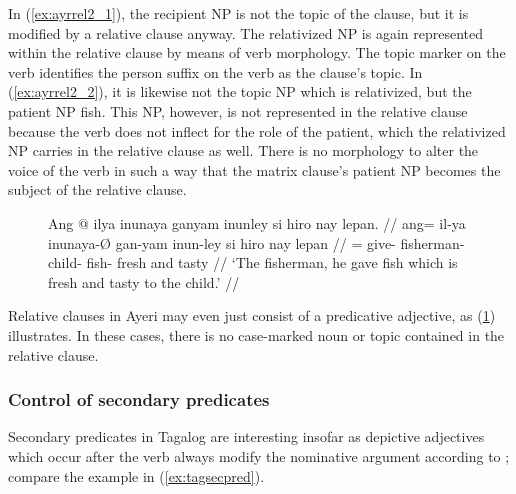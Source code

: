 In (\ref{ex:ayrrel2_1}), the recipient NP 
is not the topic of the clause, but it is modified by a relative clause anyway.
The relativized NP is again represented within the relative clause by means of
verb morphology. The topic marker on the verb identifies the person suffix on
the verb as the clause's topic. In (\ref{ex:ayrrel2_2}), it is likewise not the
topic NP which is relativized, but the patient NP 
{fish}. This NP, however, is not represented in the relative clause because the
verb does not inflect for the role of the patient, which the relativized NP
carries in the relative clause as well. There is no morphology to alter the
voice of the verb in such a way that the matrix clause's patient NP becomes the
subject of the relative clause.

\begin{figure}[h]
\ex\label{ex:ayrrel3}\begingl
	\gla Ang @ ilya inunaya ganyam inunley si hiro nay lepan. //
	\glb ang= il-ya inunaya-Ø gan-yam inun-ley si hiro nay lepan //
	\glc \AgtT{}= give-\TsgM{} fisherman-\Top{} child-\Dat{} fish-\PargI{}
	\Rel{} fresh and tasty //
	\glft `The fisherman, he gave fish which is fresh and tasty to the
		child.' //
\endgl\xe
\end{figure}

Relative clauses in Ayeri may even just consist of a predicative adjective, as
(\ref{ex:ayrrel3}) illustrates. In these cases, there is no case-marked noun or
topic contained in the relative clause.

\subsubsection{Control of secondary predicates}
\label{subsubsec:secpred}

Secondary predicates in Tagalog are interesting insofar as depictive adjectives
which occur after the verb always modify the nominative argument according to
\citet{kroeger1991}; compare the example in (\ref{ex:tagsecpred}).

